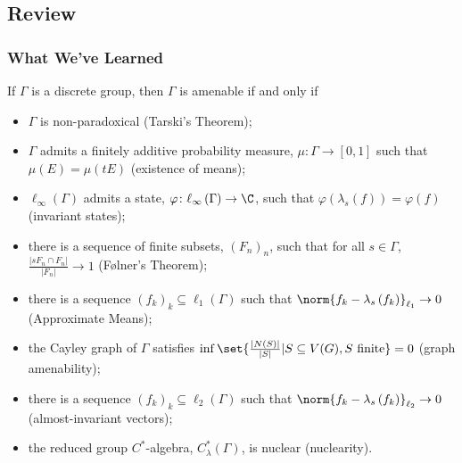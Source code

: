 \documentclass{beamer-custom}
\begin{document}
\subsection{Review}%
\begin{frame}
  \frametitle{What We've Learned}
  \small
  If $\Gamma$ is a discrete group, then $\Gamma$ is amenable if and only if
  \begin{itemize}
    \item $\Gamma$ is non-paradoxical (Tarski's Theorem);
    \item $\Gamma$ admits a finitely additive probability measure, $\mu\colon \Gamma\rightarrow [0,1]$ such that $\mu\left( E \right) = \mu\left( tE \right)$ (existence of means);
    \item $\ell_{\infty}\left( \Gamma \right)$ admits a state, $\varphi\colon \ell_{\infty}\left( \Gamma \right)\rightarrow \C$, such that $\varphi\left( \lambda_s(f) \right) = \varphi\left( f \right)$ (invariant states);
    \item there is a sequence of finite subsets, $\left( F_n \right)_n$, such that for all $s\in\Gamma$, $\frac{\left\vert sF_n\cap F_n \right\vert}{\left\vert F_n \right\vert} \rightarrow 1$ (Følner's Theorem);
    \item there is a sequence $\left( f_k \right)_k\subseteq \ell_1\left( \Gamma \right)$ such that $\norm{f_k - \lambda_s\left(f_k\right)}_{\ell_1}\rightarrow 0$ (Approximate Means);
    \item the Cayley graph of $\Gamma$ satisfies $\inf\set{\frac{\left\vert N(S) \right\vert}{\left\vert S \right\vert} | S\subseteq V(G),S\text{ finite}} = 0$ (graph amenability);
    \item there is a sequence $\left( f_k \right)_k\subseteq \ell_2\left( \Gamma \right)$ such that $\norm{f_k - \lambda_s\left(f_k\right)}_{\ell_2} \rightarrow 0$ (almost-invariant vectors);
    \item the reduced group $C^{\ast}$-algebra, $C^{\ast}_{\lambda}\left( \Gamma \right)$, is nuclear (nuclearity).
  \end{itemize}
\end{frame}
\end{document}
